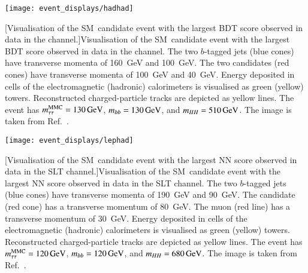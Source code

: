 {
  \centering

  \texttt{[image: event\_displays/hadhad]}

  [Visualisation of the SM~\HH candidate event with the
  largest BDT score observed in data in the \hadhad channel.]{Visualisation of
    the SM~\HH candidate event with the largest BDT score observed in data in
    the \hadhad channel. The two $b$-tagged jets (blue cones) have transverse
    momenta of \SI{160}{\GeV} and \SI{100}{\GeV}. The two \tauhadvis candidates
    (red cones) have transverse momenta of \SI{100}{\GeV} and
    \SI{40}{\GeV}. Energy deposited in cells of the electromagnetic (hadronic)
    calorimeters is visualised as green (yellow) towers. Reconstructed
    charged-particle tracks are depicted as yellow lines. The event has
    $m_{\tau\tau}^\text{MMC} = \SI{130}{\ensuremath{\text{GeV}}}$, $\mBB = \SI{130}{\GeV}$, and
    $m_{HH} = \SI{510}{\ensuremath{\text{GeV}}}$. The image is taken from Ref.~\cite{HDBS-2018-40}.}%
  \label{fig:event_display_hadhad}
}

{
  \centering

  \null\vfill

  \texttt{[image: event\_displays/lephad]}

  [Visualisation of the SM~\HH candidate event with the
  largest NN score observed in data in the \lephad SLT channel.]{Visualisation
    of the SM~\HH candidate event with the largest NN score observed in data in
    the \lephad SLT channel. The two $b$-tagged jets (blue cones) have
    transverse momenta of \SI{190}{\GeV} and \SI{90}{\GeV}. The \tauhadvis
    candidate (red cone) has a transverse momentum of \SI{80}{\GeV}. The muon
    (red line) has a transverse momentum of \SI{30}{\GeV}. Energy deposited in
    cells of the electromagnetic (hadronic) calorimeters is visualised as green
    (yellow) towers. Reconstructed charged-particle tracks are depicted as
    yellow lines. The event has $m_{\tau\tau}^\text{MMC} = \SI{120}{\ensuremath{\text{GeV}}}$,
    $\mBB = \SI{120}{\GeV}$, and $m_{HH} = \SI{680}{\ensuremath{\text{GeV}}}$. The image is taken
    from Ref.~\cite{HDBS-2018-40}.}%
  \label{fig:event_display_lephad}

  \null\vfill
}

